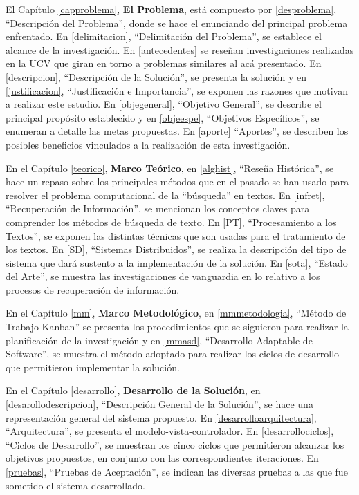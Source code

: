\documentclass[
  12pt,
  openany]{book}
\begin{document}
El Capítulo \ref{capproblema}, \textbf{El Problema}, está compuesto por \ref{desproblema}, ``Descripción del Problema'', donde se hace el enunciando del principal problema enfrentado. En \ref{delimitacion}, ``Delimitación del Problema'', se establece el alcance de la investigación. En \ref{antecedentes} se reseñan investigaciones realizadas en la UCV que giran en torno a problemas similares al acá presentado. En \ref{descripcion}, ``Descripción de la Solución'', se presenta la solución y en \ref{justificacion}, ``Justificación e Importancia'', se exponen las razones que motivan a realizar este estudio. En \ref{objegeneral}, ``Objetivo General'', se describe el principal propósito establecido y en \ref{objeespe}, ``Objetivos Específicos'', se enumeran a detalle las metas propuestas. En \ref{aporte} ``Aportes'', se describen los posibles beneficios vinculados a la realización de esta investigación.

En el Capítulo \ref{teorico}, \textbf{Marco Teórico}, en \ref{alghist}, ``Reseña Histórica'', se hace un repaso sobre los principales métodos que en el pasado se han usado para resolver el problema computacional de la ``búsqueda'' en textos. En \ref{infret}, ``Recuperación de Información'', se mencionan los conceptos claves para comprender los métodos de búsqueda de texto. En \ref{PT}, ``Procesamiento a los Textos'', se exponen las distintas técnicas que son usadas para el tratamiento de los textos. En \ref{SD}, ``Sistemas Distribuidos'', se realiza la descripción del tipo de sistema que dará sustento a la implementación de la solución. En \ref{sota}, ``Estado del Arte'', se muestra las investigaciones de vanguardia en lo relativo a los procesos de recuperación de información.

En el Capítulo \ref{mm}, \textbf{Marco Metodológico}, en \ref{mmmetodologia}, ``Método de Trabajo Kanban'' se presenta los procedimientos que se siguieron para realizar la planificación de la investigación y en \ref{mmasd}, ``Desarrollo Adaptable de Software'', se muestra el método adoptado para realizar los ciclos de desarrollo que permitieron implementar la solución.

En el Capítulo \ref{desarrollo}, \textbf{Desarrollo de la Solución}, en \ref{desarollodescripcion}, ``Descripción General de la Solución'', se hace una representación general del sistema propuesto. En \ref{desarrolloarquitectura}, ``Arquitectura'', se presenta el modelo-vista-controlador. En \ref{desarrollociclos}, ``Ciclos de Desarrollo'', se muestran los cinco ciclos que permitieron alcanzar los objetivos propuestos, en conjunto con las correspondientes iteraciones. En \ref{pruebas}, ``Pruebas de Aceptación'', se indican las diversas pruebas a las que fue sometido el sistema desarrollado.
\end{document}
